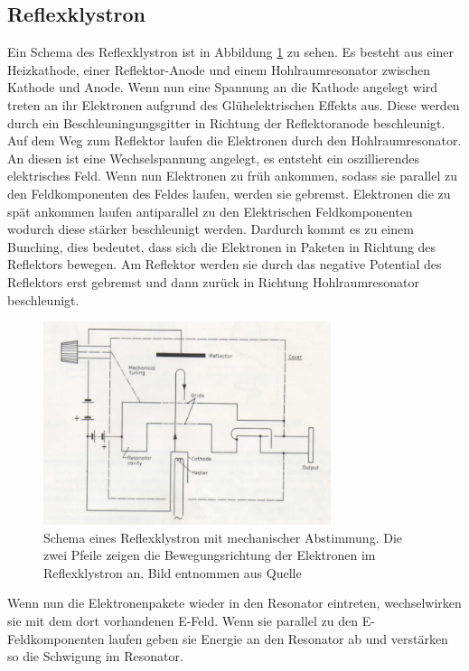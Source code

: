 \subsection{Reflexklystron}
Ein Schema des Reflexklystron ist in Abbildung \ref{fig:reflex_schema} zu sehen.
Es besteht aus einer Heizkathode, einer Reflektor-Anode und einem Hohlraumresonator zwischen Kathode und Anode.
Wenn nun eine Spannung an die Kathode angelegt wird treten an ihr Elektronen aufgrund des Glühelektrischen Effekts aus.
Diese werden durch ein Beschleuningungsgitter in Richtung der Reflektoranode beschleunigt.
Auf dem Weg zum Reflektor laufen die Elektronen durch den Hohlraumresonator.
An diesen ist eine Wechselspannung angelegt, es entsteht ein oszillierendes elektrisches Feld.
Wenn nun Elektronen zu früh ankommen, sodass sie parallel zu den Feldkomponenten des Feldes laufen, werden sie gebremst.
Elektronen die zu spät ankommen laufen antiparallel zu den Elektrischen Feldkomponenten wodurch diese stärker beschleunigt werden.
Dardurch kommt es zu einem Bunching, dies bedeutet, dass sich die Elektronen in Paketen in Richtung des Reflektors bewegen.
Am Reflektor werden sie durch das negative Potential des Reflektors erst gebremst und dann zurück in Richtung Hohlraumresonator beschleunigt.
\begin{figure}
    \centering
    \includegraphics[width=0.75\textwidth]{content/data/reflex_klystron_schema.png}
    \caption{Schema eines Reflexklystron mit mechanischer Abstimmung. Die zwei Pfeile zeigen die Bewegungsrichtung der Elektronen im Reflexklystron an. Bild entnommen aus Quelle \cite[6]{Anleitung}}
    \label{fig:reflex_schema}
\end{figure}
\FloatBarrier
Wenn nun die Elektronenpakete wieder in den Resonator eintreten, wechselwirken sie mit dem dort vorhandenen E-Feld.
Wenn sie parallel zu den E-Feldkomponenten laufen geben sie Energie an den Resonator ab und verstärken so die Schwigung im Resonator.
